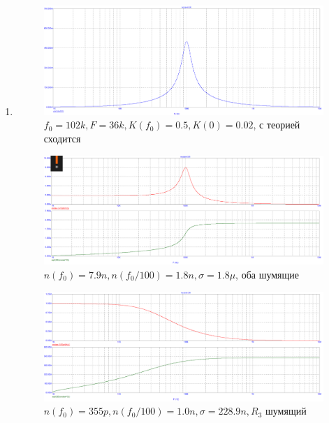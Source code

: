 \documentclass[a4paper, 12pt]{article}%
\begin{document}
\begin{enumerate}

\item

\FloatBarrier
\begin{figure}[h!]
    \centering
    \includegraphics[scale=0.3]{images/mod4_3_1.png}
    \caption{$f_0 = 102k, F = 36k, K(f_0) = 0.5, K(0) = 0.02$, с теорией сходится}
    \label{fig:m431}
\end{figure}

\begin{figure}[h!]
    \centering
    \includegraphics[scale=0.3]{images/mod4_3_2_1.png}
    \caption{$n(f_0) = 7.9n, n(f_0/100) = 1.8n, \sigma = 1.8\mu$, оба шумящие}
    \label{fig:m4321}
\end{figure}

\begin{figure}[h!]
    \centering
    \includegraphics[scale=0.3]{images/mod4_3_2_2.png}
    \caption{$n(f_0) = 355p, n(f_0/100) = 1.0n, \sigma = 228.9n, R_3$ шумящий}
    \label{fig:m4322}
\end{figure}


\end{enumerate}
\end{document}
